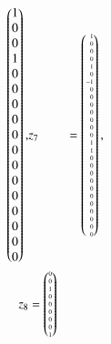 \begin{beispiel}
\begin{align*}
\begin{pmatrix*}[r]
 1\\
 0\\
 0\\
 1\\
 0\\
 0\\
 0\\
 0\\
 0\\
 0\\
 0\\
 0\\
 0\\
 0\\
 0\\
 0\\
 0
\end{pmatrix*},
&z_7 %
&=
\tiny
\begin{pmatrix*}[r]
 1\\
 0\\
 0\\
 0\\
 1\\
 0\\
-1\\
 0\\
 0\\
 0\\
 0\\
 0\\
 0\\
 0\\
 1\\
 1\\
 0\\
 0\\
 0\\
 0\\
 0\\
 0\\
 0\\
 0\\
 0\\
 0\\
 0
\end{pmatrix*},\\
z_8 %
&=
\tiny
\begin{pmatrix*}[r]
 0\\
 0\\
 1\\
 0\\
 0\\
 0\\
 0\\
 0\\
 1\\

\end{pmatrix*}
\end{align*}
\end{beispiel}
